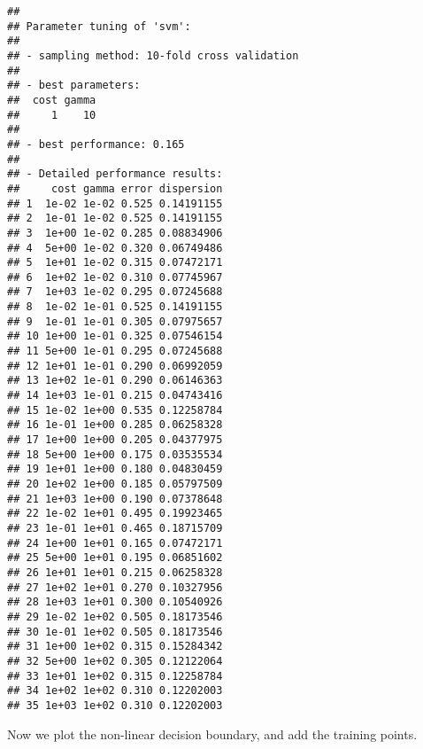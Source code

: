 \documentclass[]{article}
\newenvironment{Shaded}{\begin{snugshade}}{\end{snugshade}}
\newcommand{\NormalTok}[1]{#1}
\newcommand{\OperatorTok}[1]{\textcolor[rgb]{0.81,0.36,0.00}{\textbf{#1}}}
\newcommand{\StringTok}[1]{\textcolor[rgb]{0.31,0.60,0.02}{#1}}
\begin{document}
\begin{verbatim}
## 
## Parameter tuning of 'svm':
## 
## - sampling method: 10-fold cross validation 
## 
## - best parameters:
##  cost gamma
##     1    10
## 
## - best performance: 0.165 
## 
## - Detailed performance results:
##     cost gamma error dispersion
## 1  1e-02 1e-02 0.525 0.14191155
## 2  1e-01 1e-02 0.525 0.14191155
## 3  1e+00 1e-02 0.285 0.08834906
## 4  5e+00 1e-02 0.320 0.06749486
## 5  1e+01 1e-02 0.315 0.07472171
## 6  1e+02 1e-02 0.310 0.07745967
## 7  1e+03 1e-02 0.295 0.07245688
## 8  1e-02 1e-01 0.525 0.14191155
## 9  1e-01 1e-01 0.305 0.07975657
## 10 1e+00 1e-01 0.325 0.07546154
## 11 5e+00 1e-01 0.295 0.07245688
## 12 1e+01 1e-01 0.290 0.06992059
## 13 1e+02 1e-01 0.290 0.06146363
## 14 1e+03 1e-01 0.215 0.04743416
## 15 1e-02 1e+00 0.535 0.12258784
## 16 1e-01 1e+00 0.285 0.06258328
## 17 1e+00 1e+00 0.205 0.04377975
## 18 5e+00 1e+00 0.175 0.03535534
## 19 1e+01 1e+00 0.180 0.04830459
## 20 1e+02 1e+00 0.185 0.05797509
## 21 1e+03 1e+00 0.190 0.07378648
## 22 1e-02 1e+01 0.495 0.19923465
## 23 1e-01 1e+01 0.465 0.18715709
## 24 1e+00 1e+01 0.165 0.07472171
## 25 5e+00 1e+01 0.195 0.06851602
## 26 1e+01 1e+01 0.215 0.06258328
## 27 1e+02 1e+01 0.270 0.10327956
## 28 1e+03 1e+01 0.300 0.10540926
## 29 1e-02 1e+02 0.505 0.18173546
## 30 1e-01 1e+02 0.505 0.18173546
## 31 1e+00 1e+02 0.315 0.15284342
## 32 5e+00 1e+02 0.305 0.12122064
## 33 1e+01 1e+02 0.315 0.12258784
## 34 1e+02 1e+02 0.310 0.12202003
## 35 1e+03 1e+02 0.310 0.12202003
\end{verbatim}

\begin{Shaded}
\end{Shaded}

Now we plot the non-linear decision boundary, and add the training
points.
\end{document}
